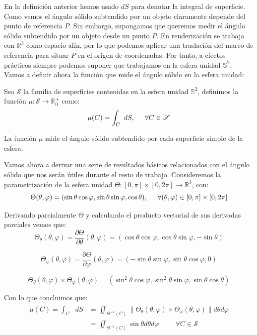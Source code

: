 En la definición anterior hemos usado $dS$ para denotar la integral de superficie. Como vemos el ángulo sólido subtendido por un objeto claramente depende del punto de referencia $P$. Sin embargo, supongamos que queremos medir el ángulo sólido subtendido por un objeto desde un punto $P$. En renderización se trabaja con $\mathds{R}^3$ como espacio afín, por lo que podemos aplicar una traslación del marco de referencia para situar $P$ en el origen de coordenadas. Por tanto, a efectos prácticos siempre podemos suponer que trabajamos en la esfera unidad $\mathds{S}^2$. Vamos a definir ahora la función que mide el ángulo sólido en la esfera unidad:

\begin{definicion}
  Sea $\mathscr{S}$ la familia de superficies contenidas en la esfera unidad $\mathds {S}^2$, definimos la función $\mu :\mathscr{S} \rightarrow \mathds{R}^+_0$ como:
  $$\mu(C) = \int_C \text{ }dS , \hspace{0.5cm} \forall C\in \mathscr{S}$$

  La función $\mu$ mide el ángulo sólido subtendido por cada superficie simple de la esfera.
\end{definicion}

Vamos ahora a derivar una serie de resultados básicos relacionados con el ángulo sólido que nos serán útiles durante el resto de trabajo. Consideremos la parametrización de la esfera unidad $\Theta:[0,\pi ]\times [0,2\pi ]\rightarrow \mathds{R}^3$, con:
$$\Theta(\theta ,\varphi ) = ( \sin \theta \cos \varphi,  \sin \theta \sin \varphi , \cos \theta),\hspace{0.5cm}  \forall (\theta , \varphi)\in [0,\pi ]\times [0,2\pi ]$$

Derivando parcialmente $\Theta$ y calculando el producto vectorial de sus derivadas parciales vemos que:
$$\Theta _\theta(\theta ,\varphi ) = \frac{\partial \Theta}{\partial \theta}(\theta ,\varphi ) = (\cos\theta\cos\varphi, \cos\theta\sin\varphi, -\sin\theta)$$

$$\Theta _\varphi(\theta ,\varphi ) = \frac{\partial \Theta}{\partial \varphi}(\theta ,\varphi ) = (-\sin\theta\sin\varphi, \sin\theta\cos\varphi, 0)$$

$$\Theta _\theta(\theta ,\varphi )\times \Theta _\varphi(\theta ,\varphi ) = (\sin^2\theta\cos\varphi,\sin^2\theta\sin\varphi,\sin\theta\cos\theta)$$

Con lo que concluimos que:
\begin{align}\label{intAngSolSin}
\begin{split}
\mu (C) = \int_C \text{ }dS &= \iint_{\Theta^{-1}(C)}\|\Theta _\theta(\theta ,\varphi )\times \Theta _\varphi(\theta ,\varphi )\| d\theta d\varphi \\
&= \iint_{\Theta^{-1}(C)} \sin\theta d\theta d\varphi \hspace{1cm} \forall C \in \mathscr{S}
\end{split}
\end{align}


